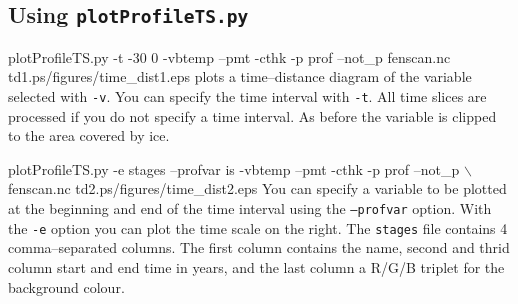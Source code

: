 \subsection{Using \texttt{plotProfileTS.py}}
\begin{pycf}{plotProfileTS.py -t -30 0 -vbtemp --pmt -cthk -p prof --not\_p fenscan.nc td1.ps}{\dir/figures/time_dist1.eps}
plots a time--distance diagram of the variable selected with \texttt{-v}. You can specify the time interval with \texttt{-t}. All time slices are processed if you do not specify a time interval. As before the variable is clipped to the area covered by ice.
\end{pycf}

\begin{pycf}{plotProfileTS.py -e stages --profvar is -vbtemp --pmt -cthk -p prof --not\_p $\backslash$ \newline fenscan.nc td2.ps}{\dir/figures/time_dist2.eps}
You can specify a variable to be plotted at the beginning and end of the time interval using the \texttt{--profvar} option. With the \texttt{-e} option you can plot the time scale on the right. The \texttt{stages} file contains 4 comma--separated columns. The first column contains the name, second and thrid column start and end time in years, and the last column a R/G/B triplet for the background colour. 
\end{pycf}
